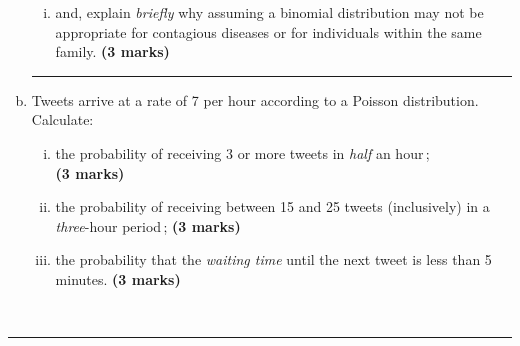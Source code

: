 \documentclass[12pt]{article}
\begin{document}
\begin{enumerate}[a)]
\begin{enumerate}[i)]
    \item and, explain \emph{briefly} why assuming a binomial distribution may not be appropriate for contagious diseases or for individuals within the same family. \hfill{\scriptsize \bf (3 marks)}
    \end{enumerate}
    \begin{center}\noindent\rule{0.4\linewidth}{0.5pt}\end{center}
\item Tweets arrive at a rate of 7 per hour according to a Poisson distribution.\\[0.3cm]
    Calculate:
    \begin{enumerate}[i)]\itemsep0.3cm
    \item the probability of receiving 3 or more tweets in \emph{half} an hour\,;\\\phantom{a} \hfill{\scriptsize \bf (3 marks)}
    \item the probability of receiving between 15 and 25 tweets (inclusively) in a \emph{three}-hour period\,; \phantom{a} \hfill{\scriptsize \bf (3 marks)}
    \item the probability that the \emph{waiting time} until the next tweet is less than 5 minutes. \hfill{\scriptsize \bf (3 marks)}
    \end{enumerate}
\end{enumerate}
\quad\\[-0.3cm]
\noindent\rule{\linewidth}{1pt}

\newpage
\end{document}
